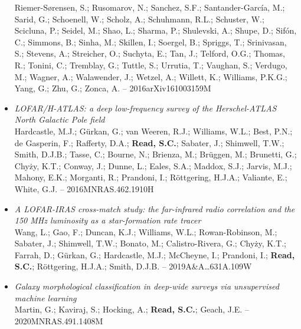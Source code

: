 \documentclass[letterpaper]{twentysecondcv} %
\begin{document}
\begin{finalpages}
\begin{itemize}
{Riemer-Sørensen, S.; Rusomarov, N.; Sanchez, S.F.; Santander-García, M.;
Sarid, G.; Schoenell, W.; Scholz, A.; Schuhmann, R.L.; Schuster, W.;
Scicluna, P.; Seidel, M.; Shao, L.; Sharma, P.; Shulevski, A.; Shupe,
D.; Sifón, C.; Simmons, B.; Sinha, M.; Skillen, I.; Soergel, B.;
Spriggs, T.; Srinivasan, S.; Stevens, A.; Streicher, O.; Suchyta, E.;
Tan, J.; Telford, O.G.; Thomas, R.; Tonini, C.; Tremblay, G.; Tuttle,
S.; Urrutia, T.; Vaughan, S.; Verdugo, M.; Wagner, A.; Walawender, J.;
Wetzel, A.; Willett, K.; Williams, P.K.G.; Yang, G.; Zhu, G.; Zonca, A. -- 2016arXiv161003159M}
 \item \textit{LOFAR/H-ATLAS: a deep low-frequency survey of the Herschel-ATLAS North
Galactic Pole field}\\{\small Hardcastle, M.J.; Gürkan, G.; van Weeren, R.J.; Williams, W.L.; Best,
P.N.; de Gasperin, F.; Rafferty, D.A.; \textbf{Read, S.C.}; Sabater, J.;
Shimwell, T.W.; Smith, D.J.B.; Tasse, C.; Bourne, N.; Brienza, M.;
Brüggen, M.; Brunetti, G.; Chyży, K.T.; Conway, J.; Dunne, L.; Eales,
S.A.; Maddox, S.J.; Jarvis, M.J.; Mahony, E.K.; Morganti, R.; Prandoni,
I.; Röttgering, H.J.A.; Valiante, E.; White, G.J. -- 2016MNRAS.462.1910H}
 \item \textit{A LOFAR-IRAS cross-match study: the far-infrared radio correlation and
the 150 MHz luminosity as a star-formation rate tracer}\\{\small Wang, L.; Gao, F.; Duncan, K.J.; Williams, W.L.; Rowan-Robinson, M.;
Sabater, J.; Shimwell, T.W.; Bonato, M.; Calistro-Rivera, G.; Chyży,
K.T.; Farrah, D.; Gürkan, G.; Hardcastle, M.J.; McCheyne, I.; Prandoni,
I.; \textbf{Read, S.C.}; Röttgering, H.J.A.; Smith, D.J.B. -- 2019A\&A\ldots631A.109W}
 \item \textit{Galaxy morphological classification in deep-wide surveys via
unsupervised machine learning}\\{\small Martin, G.; Kaviraj, S.; Hocking, A.; \textbf{Read, S.C.}; Geach, J.E. -- 2020MNRAS.491.1408M}
\end{itemize}


\end{finalpages}
\end{document}
